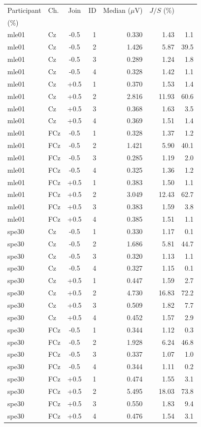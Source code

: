 \documentclass[11pt,a4paper]{article}
\newcommand{\uv}{\ensuremath{\mu\mathrm{V}}}
\begin{document}
\small\begin{longtable}{llcrrrr}\toprule Participant & Ch. & Join & ID & Median (\uv) & $J/S$ (\%) & \shortstack{Trials $\geq Q_{99}$\\(\%)}\\\midrule\endhead
mle01 & Cz & -0.5 & 1 & 0.330 & 1.43 & 1.1 \\
mle01 & Cz & -0.5 & 2 & 1.426 & 5.87 & 39.5 \\
mle01 & Cz & -0.5 & 3 & 0.289 & 1.24 & 1.8 \\
mle01 & Cz & -0.5 & 4 & 0.328 & 1.42 & 1.1 \\
mle01 & Cz & +0.5 & 1 & 0.370 & 1.53 & 1.4 \\
mle01 & Cz & +0.5 & 2 & 2.816 & 11.93 & 60.6 \\
mle01 & Cz & +0.5 & 3 & 0.368 & 1.63 & 3.5 \\
mle01 & Cz & +0.5 & 4 & 0.369 & 1.51 & 1.4 \\
mle01 & FCz & -0.5 & 1 & 0.328 & 1.37 & 1.2 \\
mle01 & FCz & -0.5 & 2 & 1.421 & 5.90 & 40.1 \\
mle01 & FCz & -0.5 & 3 & 0.285 & 1.19 & 2.0 \\
mle01 & FCz & -0.5 & 4 & 0.325 & 1.36 & 1.2 \\
mle01 & FCz & +0.5 & 1 & 0.383 & 1.50 & 1.1 \\
mle01 & FCz & +0.5 & 2 & 3.049 & 12.43 & 62.7 \\
mle01 & FCz & +0.5 & 3 & 0.383 & 1.59 & 3.8 \\
mle01 & FCz & +0.5 & 4 & 0.385 & 1.51 & 1.1 \\
spe30 & Cz & -0.5 & 1 & 0.330 & 1.17 & 0.1 \\
spe30 & Cz & -0.5 & 2 & 1.686 & 5.81 & 44.7 \\
spe30 & Cz & -0.5 & 3 & 0.320 & 1.13 & 1.1 \\
spe30 & Cz & -0.5 & 4 & 0.327 & 1.15 & 0.1 \\
spe30 & Cz & +0.5 & 1 & 0.447 & 1.59 & 2.7 \\
spe30 & Cz & +0.5 & 2 & 4.730 & 16.83 & 72.2 \\
spe30 & Cz & +0.5 & 3 & 0.509 & 1.82 & 7.7 \\
spe30 & Cz & +0.5 & 4 & 0.452 & 1.57 & 2.9 \\
spe30 & FCz & -0.5 & 1 & 0.344 & 1.12 & 0.3 \\
spe30 & FCz & -0.5 & 2 & 1.928 & 6.24 & 46.8 \\
spe30 & FCz & -0.5 & 3 & 0.337 & 1.07 & 1.0 \\
spe30 & FCz & -0.5 & 4 & 0.344 & 1.11 & 0.2 \\
spe30 & FCz & +0.5 & 1 & 0.474 & 1.55 & 3.1 \\
spe30 & FCz & +0.5 & 2 & 5.495 & 18.03 & 73.8 \\
spe30 & FCz & +0.5 & 3 & 0.550 & 1.83 & 9.4 \\
spe30 & FCz & +0.5 & 4 & 0.476 & 1.54 & 3.1 \\
\bottomrule\end{longtable}\normalsize
\end{document}
